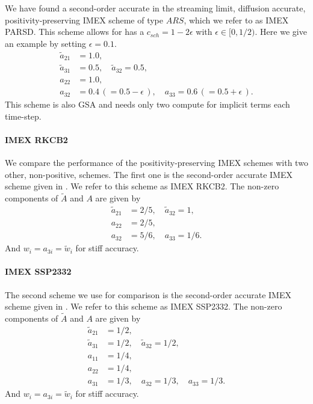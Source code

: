 We have found a second-order accurate in the streaming limit, diffusion accurate, positivity-preserving IMEX scheme of type $ARS$, which we refer to as IMEX PARSD.  
This scheme allows for has a $c_{sch}= 1 - 2\epsilon$ with $\epsilon \in [0, 1/2)$.
Here we give an example by setting $\epsilon=0.1$.
\begin{align}
  \tilde{a}_{21} & = 1.0, \nonumber \\
  \tilde{a}_{31} & = 0.5, \quad \tilde{a}_{32} = 0.5, \nonumber \\
  a_{22} & = 1.0, \nonumber \\
  a_{32} & = 0.4 \,( = 0.5 - \epsilon\,), \quad a_{33} = 0.6 \,( = 0.5 + \epsilon\,). \nonumber
\end{align} 
This scheme is also GSA and needs only two compute for implicit terms each time-step.

\paragraph{IMEX RKCB2}

We compare the performance of the positivity-preserving IMEX schemes with two other, non-positive, schemes.  
The first one is the second-order accurate IMEX scheme given in \cite{cavaglieriBewley2015}.  
We refer to this scheme as IMEX RKCB2.  
The non-zero components of $\tilde{A}$ and $A$ are given by
\begin{align}
  \tilde{a}_{21} &= 2/5, \quad \tilde{a}_{32} = 1, \nonumber \\
  a_{22} &= 2/5, \nonumber \\
  a_{32} &= 5/6, \quad a_{33} = 1/6. \nonumber
\end{align}
And $w_{i} = a_{3i} = \tilde{w}_{i}$ for stiff accuracy.

\paragraph{IMEX SSP2332}

The second scheme we use for comparison is the second-order accurate IMEX scheme given in \cite{pareschiRusso_2005}.  
We refer to this scheme as IMEX SSP2332.  
The non-zero components of $\tilde{A}$ and $A$ are given by
\begin{align}
  \tilde{a}_{21} &= 1/2, \nonumber \\
  \tilde{a}_{31} &= 1/2, \quad \tilde{a}_{32} = 1/2, \nonumber \\
  a_{11} &= 1/4, \nonumber \\
  a_{22} &= 1/4, \nonumber \\
  a_{31} &= 1/3, \quad a_{32} = 1/3, \quad a_{33} = 1/3. \nonumber
\end{align}
And $w_{i} = a_{3i} = \tilde{w}_{i}$ for stiff accuracy.


